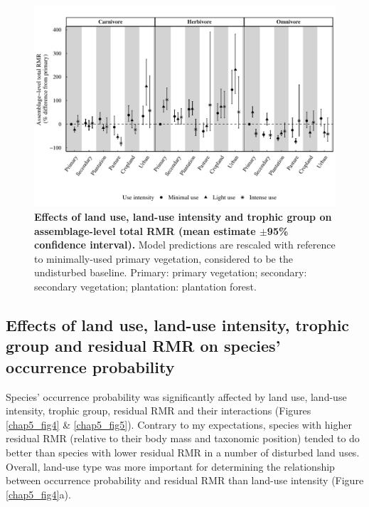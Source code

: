 \begin{figure}[h!]
\centering
\includegraphics[scale=0.75]{figures/Chapter5/Minor_corrections/tRMR_imputed}
\caption[Effects of land use, land-use intensity and trophic group on assemblage-level total RMR.]{\textbf{Effects of land use, land-use intensity and trophic group on assemblage-level total RMR (mean estimate $\pm$95\% confidence interval).} Model predictions are rescaled with reference to minimally-used primary vegetation, considered to be the undisturbed baseline. Primary: primary vegetation; secondary: secondary vegetation; plantation: plantation forest.}
\label{chap5_fig3}
\end{figure}

\pagebreak

\subsection{Effects of land use, land-use intensity, trophic group and residual RMR on species' occurrence probability}

Species’ occurrence probability was significantly affected by land use, land-use intensity, trophic group, residual RMR and their interactions (Figures \ref{chap5_fig4} \& \ref{chap5_fig5}). Contrary to my expectations, species with higher residual RMR (relative to their body mass and taxonomic position) tended to do better than species with lower residual RMR in a number of disturbed land uses. Overall, land-use type was more important for determining the relationship between occurrence probability and residual RMR than land-use intensity (Figure \ref{chap5_fig4}a).

